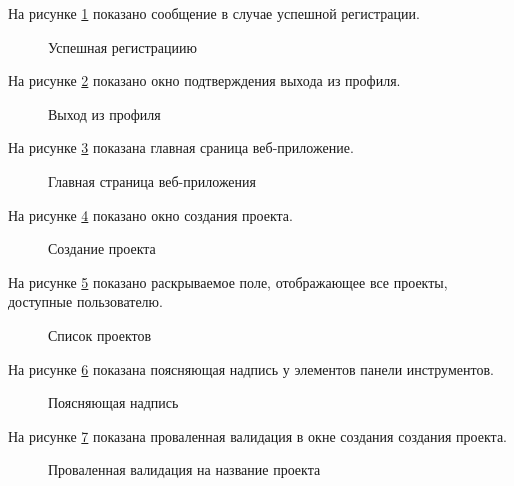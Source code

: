 На рисунке \ref{регистрация_успешна:image} показано сообщение в случае успешной регистрации.
\begin{figure}[ht]
	\caption{Успешная регистрациию}
	\label{регистрация_успешна:image}
\end{figure}

На рисунке \ref{окно_выхода:image} показано окно подтверждения выхода из профиля.

\newpage

\begin{figure}[ht]
	\caption{Выход из профиля}
	\label{окно_выхода:image}
\end{figure}

На рисунке \ref{главная_страница:image} показана главная сраница веб-приложение.
\begin{figure}[ht]
	\caption{Главная страница веб-приложения}
	\label{главная_страница:image}
\end{figure}

На рисунке \ref{проект_создание:image} показано окно создания проекта.

\newpage

\begin{figure}[ht]
	\caption{Создание проекта}
	\label{проект_создание:image}
\end{figure}


На рисунке \ref{список_проектов:image} показано раскрываемое поле, отображающее все проекты, доступные пользователю.
\begin{figure}[ht]
	\caption{Список проектов}
	\label{список_проектов:image}
\end{figure}

\newpage

На рисунке \ref{проверка_надписи:image} показана поясняющая надпись у элементов панели инструментов.
\begin{figure}[ht]
	\caption{Поясняющая надпись}
	\label{проверка_надписи:image}
\end{figure}

На рисунке \ref{проект_создание_некорректно:image} показана проваленная валидация в окне создания создания проекта.
\begin{figure}[ht]
	\caption{Проваленная валидация на название проекта}
	\label{проект_создание_некорректно:image}
\end{figure}

